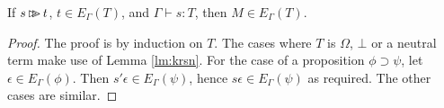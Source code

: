 \begin{lm}
\label{lm:expand-compute}
If $s \mathop{\rhd \!\!\! \rhd} t$, $t \in E_\Gamma(T)$, and $\Gamma \vdash s : T$, then $M \in E_\Gamma(T)$.
\end{lm}

\begin{proof}
The proof is by induction on $T$.  The cases where $T$ is $\Omega$, $\bot$ or a neutral term make use of Lemma \ref{lm:krsn}.  For the case of a proposition $\phi \supset \psi$, let $\epsilon \in E_\Gamma(\phi)$.  Then $s' \epsilon \in E_\Gamma(\psi)$, hence $s \epsilon \in E_\Gamma(\psi)$ as required.  The other cases are similar.
\end{proof}

\begin{code}%
\> \AgdaSymbol{:}  \AgdaSymbol{\{}\AgdaSymbol{\}} \AgdaSymbol{\{}\AgdaSymbol{\}} \AgdaSymbol{\{} \AgdaSymbol{:}  \AgdaSymbol{\}} \AgdaSymbol{\{} \AgdaSymbol{:}   \AgdaSymbol{(} \AgdaSymbol{)\}} \AgdaSymbol{\{}  \AgdaSymbol{:}   \AgdaSymbol{(} \AgdaSymbol{)\}} \<%
\\
\>[0]\<[2]%
\>[2]                     \<%
\end{code}

